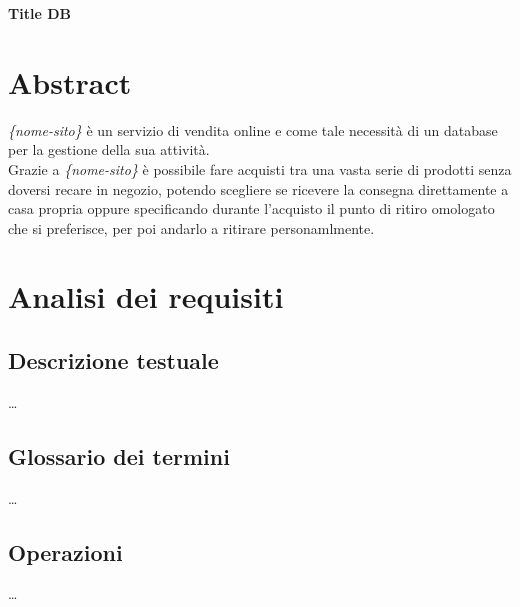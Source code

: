 \documentclass[11pt]{article}
\begin{document}
\begin{center}
    \huge\textbf{Title DB}
\end{center}

\section{Abstract}

\textit{\{nome-sito\}} è un servizio di vendita online e come tale necessità di un database
per la gestione della sua attività.\\
Grazie a \textit{\{nome-sito\}} è possibile fare acquisti tra una vasta serie di prodotti 
senza doversi recare in negozio, potendo scegliere se ricevere la consegna direttamente a casa
propria oppure specificando durante l'acquisto il punto di ritiro omologato che si preferisce,
per poi andarlo a ritirare personamlmente.


\section{Analisi dei requisiti}

\subsection{Descrizione testuale}

\dots

\subsection{Glossario dei termini}

\dots

\subsection{Operazioni}

\dots
\end{document}
